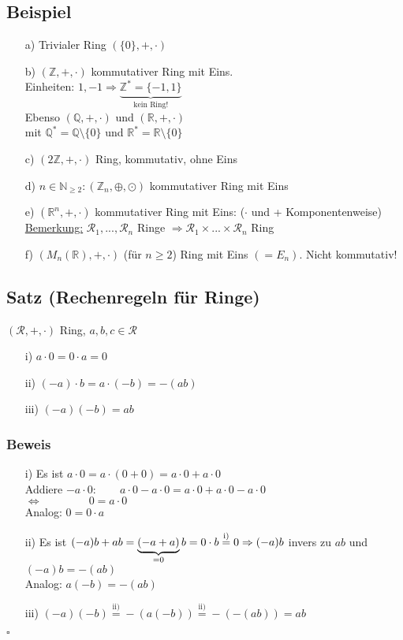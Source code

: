 \documentclass[12pt,titlepage, pdf]{article}
\newcommand{\R}{\mathds{R}}
\newcommand{\uline}[1]{\underline{#1}}
\renewcommand{\>}{\rightarrow}
\renewcommand{\*}{\cdot}
\begin{document}
\subsection{Beispiel}
\begin{itemize}
	\item[a)] Trivialer Ring $(\{0\},+,\cdot)$
	\item[b)] $(\mathbb{Z}, +,\cdot)$ kommutativer Ring mit Eins. \\
	Einheiten: $1, -1\Rightarrow \underbrace{\mathbb{Z}^* = \{-1,1\}}_{\text{kein Ring!}}$\\
	Ebenso $(\mathbb{Q},+,\cdot)$ und $(\mathbb{R},+,\cdot)$ \\
	mit $\mathbb{Q}^* = \mathbb{Q} \setminus \{0\}$ und $\mathbb{R}^* =  \mathbb{R} \setminus \{0\}$
	\item[c)] $(2\mathbb{Z},+,\cdot)$ Ring, kommutativ, ohne Eins
	\item[d)] $n \in \mathbb{N}_{\geq 2}: (\mathbb{Z}_n, \oplus, \odot)$ kommutativer Ring mit Eins
	\item[e)] $(\R^n, + ,\cdot)$ kommutativer Ring mit Eins: ($\cdot$ und + Komponentenweise)\\
	\uline{Bemerkung:} $\mathcal{R}_1,...,\mathcal{R}_n$ Ringe $\Rightarrow \mathcal{R}_1 \times ... \times \mathcal{R}_n$ Ring
	\item[f)] $(M_n(\R),+, \cdot)$ (für $n\geq 2$) Ring mit Eins $(= E_n)$. Nicht kommutativ! 
\end{itemize}
\subsection{Satz (Rechenregeln für Ringe)}
\label{4.3}
$(\mathcal{R}, +,\cdot)$ Ring, $a,b,c \in \mathcal{R}$
\begin{itemize}
	\item[i)] $a \cdot 0 = 0 \cdot a = 0$
	\item[ii)] $(-a) \cdot b = a \cdot (-b) = -(ab)$
	\item[iii)] $(-a)(-b) = ab$
\end{itemize}	
\subsubsection*{Beweis}
\begin{itemize}
	\item[i)] Es ist $a \cdot 0 = a \cdot (0 + 0)= a \cdot 0 + a \cdot 0$\\
	Addiere $-a \cdot 0:\qquad a \cdot 0 - a \cdot 0 = a \cdot 0 + a \cdot 0 - a \cdot 0 $\\
	\noindent\hspace*{30mm}$\Leftrightarrow \qquad\qquad~0 = a \cdot 0$\\
	Analog: $0 = 0 \cdot a$
	\item[ii)] Es ist $(-a)b + ab = \underbrace{(-a+a)}_{=0}b = 0 \cdot b \overset{\textrm{i)}}{=} 0\\
	\Rightarrow (-a)b$ invers zu $ab$ und $(-a)b = -(ab)$ \\
	Analog: $a(-b) = -(ab)$
	\item[iii)] $(-a)(-b) \overset{\textrm{ii)}}{=} -(a(-b)) \overset{\textrm{ii)}}{=} -(-(ab)) = ab$
\end{itemize}
\hfill$\square$
\end{document}
